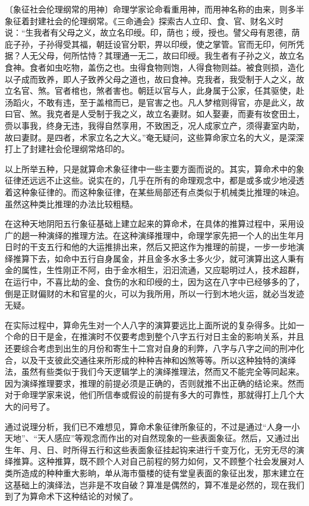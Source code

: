 \documentclass[a5paper,oneside,12pt]{ctexbook}
\begin{document}
{{〔象征社会伦理纲常的用神〕命理学家论命看重用神，而用神名称的由来，则多半象征着封建社会的伦理纲常。《三命通会》探索古人立印、食、官、财名义时说：“生我者有父母之义，故立名印绶。印，荫也；绶，授也。譬父母有恩德，荫庇子孙，子孙得受其福，朝廷设官分职，畀以印绶，使之掌管。官而无印，何所凭据？人无父母，何所怙恃？其理通一无二，故曰印绶。我生者有子孙之义，故立名食神。食者如虫吃物，盖伤之也。虫得食物则饱，人得食物则益。被食则损，造化以子成而致养，即人子致养父母之道也，故曰食神。克我者，我受制于人之义，故立名官、煞。官者棺也，煞者害也。朝廷以官与人，此身属于公家，任其驱使，赴汤蹈火，不敢有违，至于盖棺而已，是官害之也。凡人梦棺则得官，亦是此义，故曰官、煞。我克者是人受制于我之义，故立名妻财。如人娶妻，而妻有妆奁田土，赍以事我，终身无违，我得自然享用，不致困乏，况人成家立产，须得妻室内助，故曰妻财。是四者，术家立名之大义。”奄无疑问，这些算命家立名的大义，是深深打上了封建社会伦理纲常烙印的。

以上所举五种，只是就算命术象征律中一些主要方面而说的。其实，算命术中的象征律还远远不止这些。说实在的，几乎在所有的命理观念中，都是或多或少地浸透着这种象征律的。而这种象征律，在某些局部还有点类似于机械类比推理的味迫。虽然这种类比推理的办法比较粗糙。

在这种天地阴阳五行象征基础上建立起来的算命术，在具体的推算过程中，采用设广的趟一种演绎的推理方法。在这种演绎推理中，命理学家先把一个人的出生年月日时的干支五行和他的大运推排出来，然后又把这作为推理的前提，一步一步地演绎推算下去，如命中五行自身属金，并且金多水多土多火少，就可演算出这人秉有金的属性，生性刚正不阿，由于金水相生，汩汩流通，又应聪明过人，技术超群，在运行中，不喜比劫的金、食伤的水和印绶的土，因为这在八字中已经够多的了，倒是正财偏财的木和官星的火，可以为我所用，所以一行到木地火运，就必当发迹无疑。

在实际过程中，算命先生对一个人八字的演算要远比上面所说的复杂得多。比如一个命的日干是金，在推演时不仅要考虑到整个八字五行对日主金的影响关系，并且还要综合考虑到出生的月份和寄生十二宫对自身的利弊，八字与八字之间的刑冲化合，以及干支彼此交通往来所形成的种种吉神和凶煞等等。所以这种独特的演绎法，虽然有些类似于我们今天逻辑学上的演绎推理法，然而又不能完全等同起来。因为演绎推理要求，推理的前提必须是正确的，否则就推不出正确的结论来。然而对于命理学家来说，他们所信奉或假设的前提有多大的可靠性，那就得打上几个大大的问号了。

通过说理分析，我们已不难想见，算命术象征律所象征的，不过是通过“人身一小天地”、“天人感应”等观念而作出的对自然现象的一些表面象征。然后，又通过出生年、月、日、时所得五行和这些表面象征挂起钩来进行千变万化，无穷无尽的演绎推算。这种推算，既不顾个人对自己前程的努力如何，又不顾整个社会发展对人类所造成的种种重大影晌，单从海市蜃楼的徒有堂皇表面的象征出发，那末建立在这基础上的演绎法，岂非是不攻自破？算准是偶然的，算不准是必然的，现在我们到了为算命术下这种结论的对候了。

}}
\end{document}
